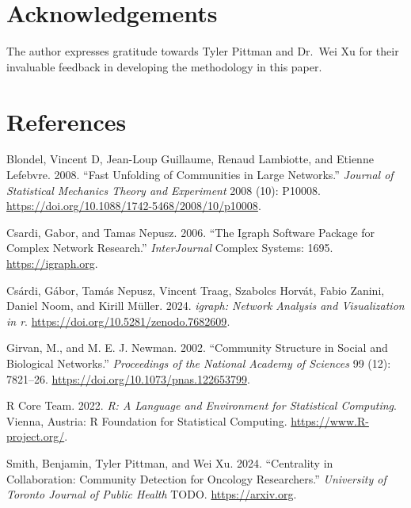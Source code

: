 \documentclass[10pt,a4paper,onecolumn]{article}
\newlength{\cslhangindent}
\newenvironment{CSLReferences}[2] %
 {\begin{list}{}{%
  \setlength{\itemindent}{0pt}
  \setlength{\leftmargin}{0pt}
  \setlength{\parsep}{0pt}
  \ifodd #1
   \setlength{\leftmargin}{\cslhangindent}
   \setlength{\itemindent}{-1\cslhangindent}
  \fi
  \setlength{\itemsep}{#2\baselineskip}}}
 {\end{list}}
\begin{document}
\section{Acknowledgements}\label{acknowledgements}

The author expresses gratitude towards Tyler Pittman and Dr.~Wei Xu for
their invaluable feedback in developing the methodology in this paper.

\section*{References}\label{references}

\label{refs}
\begin{CSLReferences}{1}{0}
Blondel, Vincent D, Jean-Loup Guillaume, Renaud Lambiotte, and Etienne
Lefebvre. 2008. {``Fast Unfolding of Communities in Large Networks.''}
\emph{Journal of Statistical Mechanics Theory and Experiment} 2008 (10):
P10008. \url{https://doi.org/10.1088/1742-5468/2008/10/p10008}.

Csardi, Gabor, and Tamas Nepusz. 2006. {``The Igraph Software Package
for Complex Network Research.''} \emph{InterJournal} Complex Systems:
1695. \url{https://igraph.org}.

Csárdi, Gábor, Tamás Nepusz, Vincent Traag, Szabolcs Horvát, Fabio
Zanini, Daniel Noom, and Kirill Müller. 2024. \emph{{igraph}: Network
Analysis and Visualization in r}.
\url{https://doi.org/10.5281/zenodo.7682609}.

Girvan, M., and M. E. J. Newman. 2002. {``Community Structure in Social
and Biological Networks.''} \emph{Proceedings of the National Academy of
Sciences} 99 (12): 7821--26.
\url{https://doi.org/10.1073/pnas.122653799}.

R Core Team. 2022. \emph{R: A Language and Environment for Statistical
Computing}. Vienna, Austria: R Foundation for Statistical Computing.
\url{https://www.R-project.org/}.

Smith, Benjamin, Tyler Pittman, and Wei Xu. 2024. {``Centrality in
Collaboration: Community Detection for Oncology Researchers.''}
\emph{University of Toronto Journal of Public Health} TODO.
\url{https://arxiv.org}.

\end{CSLReferences}
\end{document}
